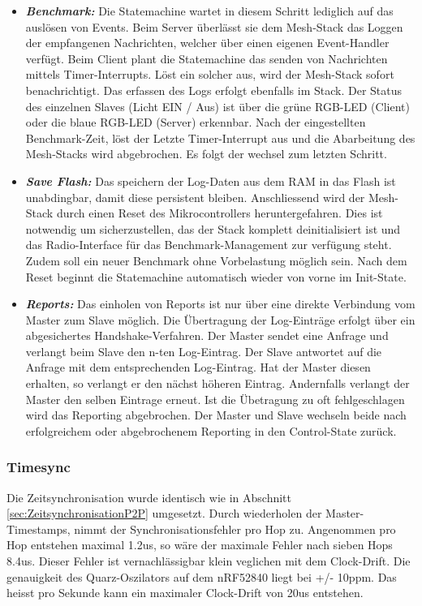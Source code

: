 \begin{itemize}
	\item \textbf{\textit{Benchmark:}} Die Statemachine wartet in diesem Schritt lediglich auf das auslösen von Events. Beim Server überlässt sie dem Mesh-Stack das Loggen der empfangenen Nachrichten, welcher über einen eigenen Event-Handler verfügt. Beim Client plant die Statemachine das senden von Nachrichten mittels Timer-Interrupts. Löst ein solcher aus, wird der Mesh-Stack sofort benachrichtigt. Das erfassen des Logs erfolgt ebenfalls im Stack. Der Status des einzelnen Slaves (Licht EIN / Aus) ist über die grüne RGB-LED (Client) oder die blaue RGB-LED (Server) erkennbar. Nach der eingestellten Benchmark-Zeit, löst der Letzte Timer-Interrupt aus und die Abarbeitung des Mesh-Stacks wird abgebrochen. Es folgt der wechsel zum letzten Schritt. 
	\item  \textbf{\textit{Save Flash:}} Das speichern der Log-Daten aus dem RAM in das Flash ist unabdingbar, damit diese persistent bleiben. Anschliessend wird der Mesh-Stack durch einen Reset des Mikrocontrollers heruntergefahren. Dies ist notwendig um sicherzustellen, das der Stack komplett deinitialisiert ist und das Radio-Interface für das Benchmark-Management zur verfügung steht. Zudem soll ein neuer Benchmark ohne Vorbelastung möglich sein. Nach dem Reset beginnt die Statemachine automatisch wieder von vorne im Init-State. 
	\item  \textbf{\textit{Reports:}} Das einholen von Reports ist nur über eine direkte Verbindung vom Master zum Slave möglich. Die Übertragung der Log-Einträge erfolgt über ein abgesichertes Handshake-Verfahren. Der Master sendet eine Anfrage und verlangt beim Slave den n-ten Log-Eintrag. Der Slave antwortet auf die Anfrage mit dem entsprechenden Log-Eintrag. Hat der Master diesen erhalten, so verlangt er den nächst höheren Eintrag. Andernfalls verlangt der Master den selben Eintrage erneut. Ist die Übetragung zu oft fehlgeschlagen wird das Reporting abgebrochen. Der Master und Slave wechseln beide nach erfolgreichem oder abgebrochenem Reporting in den Control-State zurück.  
\end{itemize}

\subsubsection{Timesync}\label{subsubsec:Timesync}

Die Zeitsynchronisation wurde identisch wie in Abschnitt \ref{sec:ZeitsynchronisationP2P} umgesetzt. Durch wiederholen der Master-Timestamps, nimmt der Synchronisationsfehler pro Hop zu. Angenommen pro Hop entstehen maximal 1.2us, so wäre der maximale Fehler nach sieben Hops 8.4us. Dieser Fehler ist vernachlässigbar klein veglichen mit dem Clock-Drift. Die genauigkeit des Quarz-Oszilators auf dem nRF52840 liegt bei +/- 10ppm. Das heisst pro Sekunde kann ein maximaler Clock-Drift von 20us entstehen. 

